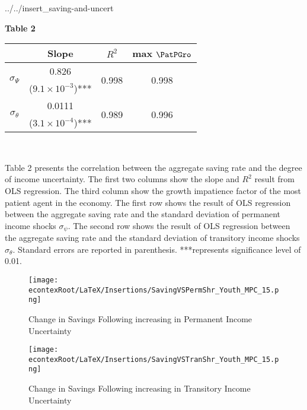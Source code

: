 \documentclass[../../cjSOE.tex]{subfiles}
\begin{document}
\begin{verbatimwrite}{../../insert_saving-and-uncert}
\begin{table}
	\centerline{\bf Table 2}
	\label{tab:Uncert}
	\begin{center}
		\begin{tabular}{ c c c c }
			\hline
			~ & Slope & $R^2$ & max $\PatPGro$\\
			\hline 
			\multirow{2}{4em}{$\sigma_{\Psi}$} & 0.826 & \multirow{2}{*}{0.998} & \multirow{2}{4em}{0.998}\\
			& ($9.1\times10^{-3}$)***\\
			\multirow{2}{4em}{$\sigma_{\theta}$} & 0.0111 & \multirow{2}{*}{0.989} & \multirow{2}{4em}{0.996}\\
			& ($3.1\times10^{-4}$)***\\
			\hline
		\end{tabular}
		\\
	\end{center}
	\begin{tablenotes}
		\small
		\item Table 2 presents the correlation between the aggregate saving rate and the degree of income uncertainty. The first two columns show the slope and $R^2$ result from OLS regression. The third column show the growth impatience factor of the most patient agent in the economy. The first row shows the result of OLS regression between the aggregate saving rate and the standard deviation of permanent income shocks $\sigma_{\psi}$. The second row shows the result of OLS regression between the aggregate saving rate and the standard deviation of transitory income shocks $\sigma_{\theta}$. Standard errors are reported in parenthesis. ***represents significance level of 0.01. 
	\end{tablenotes}
\end{table}

\begin{figure}[h]
	\texttt{[image: \\econtexRoot/LaTeX/Insertions/SavingVSPermShr\_Youth\_MPC\_15.png]}
	\centering
	\caption{Change in Savings Following increasing in Permanent Income Uncertainty}
	\label{figure:savings}
	
	\texttt{[image: \\econtexRoot/LaTeX/Insertions/SavingVSTranShr\_Youth\_MPC\_15.png]}
	\centering
	\caption{Change in Savings Following increasing in Transitory Income Uncertainty}
	\label{figure:savingsTran}
\end{figure}

\end{verbatimwrite}




\end{document}
